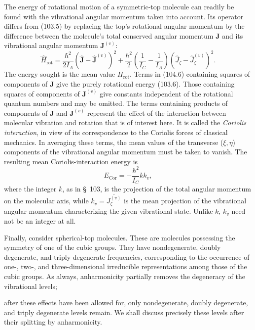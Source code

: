 The energy of rotational motion of a symmetric-top molecule can readily be found with the vibrational angular momentum taken into account. Its operator differs from (103.5) by replacing the top's rotational angular momentum by the difference between the molecule's total conserved angular momentum $\mathbf J$ and its vibrational angular momentum $\mathbf J^{(v)}$:
\begin{equation}
 \widehat H_{\text{rot}}=\frac{\hbar^2}{2I_A}(\widehat{\mathbf J}-\widehat{\mathbf J}^{(v)})^2
 +\frac{\hbar^2}{2}\left(\frac1{I_C}-\frac1{I_A}\right)
 (\widehat J_\zeta-\widehat J_\zeta^{(v)})^2.
 \tag{104.6}
\end{equation}
The energy sought is the mean value $\overline{H}_{\text{rot}}$. Terms in (104.6) containing squares of components of $\mathbf J$ give the purely rotational energy (103.6). Those containing squares of components of $\mathbf J^{(v)}$ give constants independent of the rotational quantum numbers and may be omitted. The terms containing products of components of $\mathbf J$ and $\mathbf J^{(v)}$ represent the effect of the interaction between molecular vibration and rotation that is of interest here. It is called the \emph{Coriolis interaction}, in view of its correspondence to the Coriolis forces of classical mechanics. In averaging these terms, the mean values of the transverse ($\xi,\eta$) components of the vibrational angular momentum must be taken to vanish. The resulting mean Coriolis-interaction energy is
\begin{equation}
 E_{\text{Cor}}=-\frac{\hbar^2}{I_C}kk_v,
 \tag{104.7}
\end{equation}
where the integer $k$, as in §~103, is the projection of the total angular momentum on the molecular axis, while $k_v=\overline{J_\zeta^{(v)}}$ is the mean projection of the vibrational angular momentum characterizing the given vibrational state. Unlike $k$, $k_v$ need not be an integer at all.

Finally, consider spherical-top molecules. These are molecules possessing the symmetry of one of the cubic groups. They have nondegenerate, doubly degenerate, and triply degenerate frequencies, corresponding to the occurrence of one-, two-, and three-dimensional irreducible representations among those of the cubic groups. As always, anharmonicity partially removes the degeneracy of the vibrational levels;

after these effects have been allowed for, only nondegenerate, doubly degenerate, and triply degenerate levels remain. We shall discuss precisely these levels after their splitting by anharmonicity.

